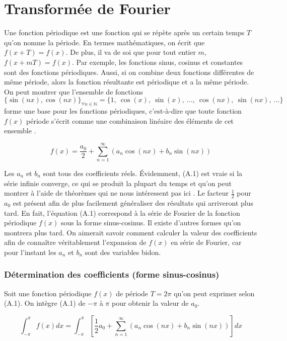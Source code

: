 \renewcommand{\theequation}{A.\arabic{equation}}
\setcounter{equation}{0}
\section{Transformée de Fourier}
Une fonction périodique est une fonction qui se répète après un certain temps $T$ qu'on nomme la période. En termes mathématiques, on écrit que $f(x + T) = f(x)$. De plus, il va de soi que pour tout entier $m$, $f(x + mT) = f(x)$. Par exemple, les fonctions sinus, cosinus et constantes sont des fonctions périodiques. Aussi, si on combine deux fonctions différentes de même période, alors la fonction résultante est périodique et a la même période. On peut montrer que l'ensemble de fonctions $\{\sin(nx), \cos(nx)\}_{\forall n \in \mathbb{N}} = \{1, \ \cos(x), \ \sin(x), \ ..., \ \cos(nx),\ \sin(nx), \ ... \}$ forme une base pour les fonctions périodiques, c'est-à-dire que toute fonction $f(x)$ période s'écrit comme une combinaison linéaire des éléments de cet ensemble \cite{kreyszig11}.

\begin{equation}
    f(x) = \frac{a_0}{2} + \sum_{n=1}^{\infty} \left(a_n\cos(nx) + b_n\sin(nx)\right)    
\end{equation}

Les $a_n$ et $b_n$ sont tous des coefficients réels. Évidemment, (A.1) est vraie si la série infinie converge, ce qui se produit la plupart du temps et qu'on peut montrer à l'aide de  théorèmes qui ne nous intéressent pas ici \cite{kreyszig11}. Le facteur $\frac{1}{2}$ pour $a_0$ est présent afin de plus facilement généraliser des résultats qui arriveront plus tard. En fait, l'équation (A.1) correspond à la série de Fourier de la fonction périodique $f(x)$ sous la forme sinus-cosinus. Il existe d'autres formes qu'on montrera plus tard. On aimerait savoir comment calculer la valeur des coefficients afin de connaître véritablement l'expansion de $f(x)$ en série de Fourier, car pour l'instant les $a_n$ et $b_n$ sont des variables bidon.

\subsubsection*{Détermination des coefficients (forme sinus-cosinus)}
Soit une fonction périodique  $f(x)$ de période $T = 2\pi$ qu'on peut exprimer selon (A.1). On intègre (A.1) de $-\pi$ à $\pi$ pour obtenir la valeur de $a_0$.

\begin{equation*}
    \int_{-\pi}^{\pi} f(x) dx = \int_{-\pi}^{\pi} \left[\frac{1}{2}a_0 + \sum_{n=1}^{\infty} (a_n \cos(nx) + b_n \sin(nx))\right] dx
\end{equation*}

